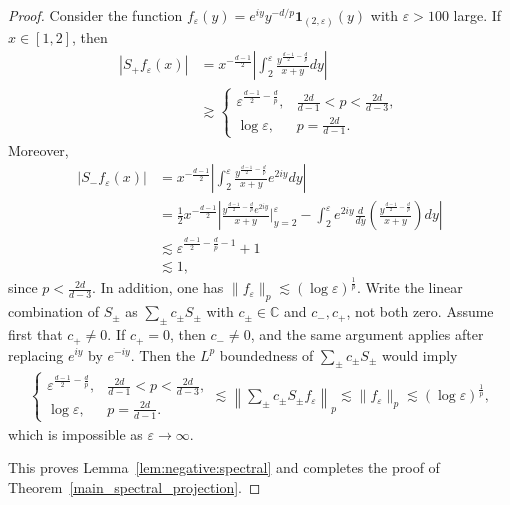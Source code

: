 \documentclass[12pt]{amsart}
\begin{document}
\begin{proof}
Consider the function $f_\varepsilon(y) = e^{iy}y^{-d/p} \mathbf{1}_{(2,\varepsilon)}(y)$ with $\varepsilon>100$ large. If $x\in [1,2]$, then
\begin{align*}
    \left|S_+ f_\varepsilon(x)\right| &= x^{-\frac{d-1}{2}} \left| \int_2^\varepsilon \frac{y^{\frac{d-1}{2}-\frac{d}{p}}}{x+y} dy \right|\\
    &\gtrsim \begin{cases}
        \varepsilon^{\frac{d-1}{2}-\frac{d}{p}}, & \frac{2d}{d-1}<p<\frac{2d}{d-3},\\
        \log{\varepsilon}, & p=\frac{2d}{d-1}.
    \end{cases}
\end{align*}
Moreover,
\begin{align*}
    |S_-f_\varepsilon(x)| &= x^{-\frac{d-1}{2}} \left| \int_2^\varepsilon \frac{y^{\frac{d-1}{2}-\frac{d}{p}}}{x+y} e^{2iy} dy \right|\\
    &= \frac{1}{2} x^{-\frac{d-1}{2}} \left| \frac{y^{\frac{d-1}{2}-\frac{d}{p}}e^{2iy}}{x+y}\bigg|_{y=2}^\varepsilon -  \int_2^\varepsilon e^{2iy} \frac{d}{dy}\left(\frac{y^{\frac{d-1}{2}-\frac{d}{p}}}{x+y}\right) dy \right|\\
    &\lesssim \varepsilon^{\frac{d-1}{2}-\frac{d}{p}-1} + 1\\
    &\lesssim 1,
\end{align*}
since $p<\frac{2d}{d-3}$. In addition, one has $\|f_\varepsilon\|_p\lesssim (\log{\varepsilon})^{\frac 1p}$. Write the linear combination of $S_\pm$ as $\sum_{\pm}c_\pm S_\pm$ with $c_\pm \in \mathbb C$ and $c_-,c_+$, not both zero. 
Assume first that \(c_+\ne0\). If \(c_+=0\), then \(c_-\ne0\), and the
same argument applies after replacing \(e^{iy}\) by \(e^{-iy}\).
Then the $L^p$ boundedness of $\sum_{\pm}c_\pm S_\pm$ would imply
\begin{align*}
\begin{cases}
        \varepsilon^{\frac{d-1}{2}-\frac{d}{p}}, & \frac{2d}{d-1}<p<\frac{2d}{d-3},\\
        \log{\varepsilon}, & p=\frac{2d}{d-1}.
    \end{cases} \lesssim \left\| \sum_{\pm} c_\pm S_\pm f_\varepsilon \right\|_p \lesssim \|f_\varepsilon\|_p \lesssim (\log{\varepsilon})^{\frac{1}{p}},
\end{align*}
which is impossible as $\varepsilon \to \infty$.

This proves Lemma~\ref{lem:negative:spectral} and completes the proof of Theorem~\ref{main_spectral_projection}.
\end{proof}
\end{document}
